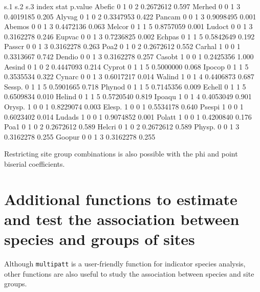 \documentclass[11pt,a4paper]{article}
\begin{document}
\begin{Schunk}
\begin{Soutput}
       s.1 s.2 s.3 index      stat p.value
Abefic   0   1   0     2 0.2672612   0.597
Merhed   0   0   1     3 0.4019185   0.205
Alyvag   0   1   0     2 0.3347953   0.422
Pancam   0   0   1     3 0.9098495   0.001
Abemos   0   0   1     3 0.4472136   0.063
Melcor   0   1   1     5 0.8757059   0.001
Ludoct   0   0   1     3 0.3162278   0.246
Eupvac   0   0   1     3 0.7236825   0.002
Echpas   0   1   1     5 0.5842649   0.192
Passcr   0   0   1     3 0.3162278   0.263
Poa2     0   1   0     2 0.2672612   0.552
Carhal   1   0   0     1 0.3313667   0.742
Dendio   0   0   1     3 0.3162278   0.257
Casobt   1   0   0     1 0.2425356   1.000
Aesind   0   1   0     2 0.4447093   0.214
Cyprot   0   1   1     5 0.5000000   0.068
Ipocop   0   1   1     5 0.3535534   0.322
Cynarc   0   0   1     3 0.6017217   0.014
Walind   1   0   1     4 0.4406873   0.687
Sessp.   0   1   1     5 0.5901665   0.718
Phynod   0   1   1     5 0.7145356   0.009
Echell   0   1   1     5 0.6509834   0.010
Helind   0   1   1     5 0.5720540   0.819
Ipoaqu   1   0   1     4 0.4053049   0.901
Orysp.   1   0   0     1 0.8229074   0.003
Elesp.   1   0   0     1 0.5534178   0.640
Psespi   1   0   0     1 0.6023402   0.014
Ludads   1   0   0     1 0.9074852   0.001
Polatt   1   0   0     1 0.4200840   0.176
Poa1     0   1   0     2 0.2672612   0.589
Helcri   0   1   0     2 0.2672612   0.589
Physp.   0   0   1     3 0.3162278   0.255
Goopur   0   0   1     3 0.3162278   0.255
\end{Soutput}
\end{Schunk}
Restricting site group combinations is also possible with the phi and point biserial coefficients. 

\section{Additional functions to estimate and test the association between species and groups of sites}
Although \texttt{multipatt} is a user-friendly function for indicator species analysis, other functions are also useful to study the association between species and site groups. 
\end{document}
